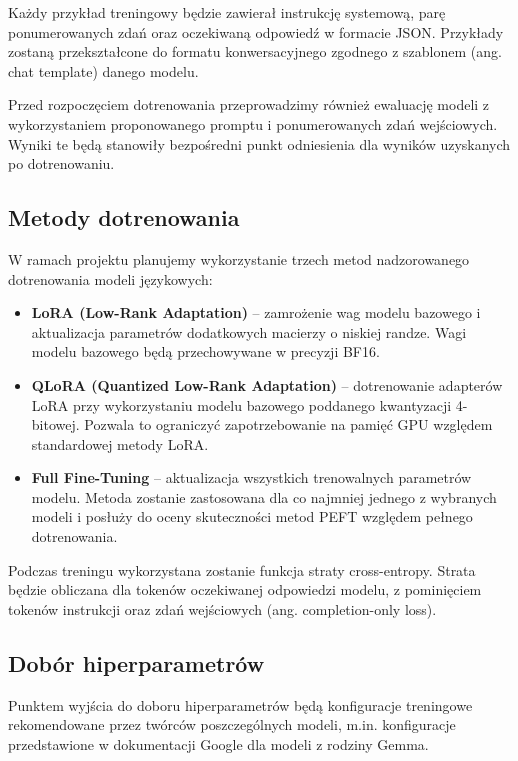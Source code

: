 \documentclass[a4paper,10pt]{article}
\begin{document}
Każdy przykład treningowy będzie zawierał instrukcję
systemową, parę ponumerowanych zdań oraz oczekiwaną
odpowiedź w formacie JSON. Przykłady zostaną przekształcone
do formatu konwersacyjnego zgodnego z szablonem
(ang. chat template) danego modelu.

Przed rozpoczęciem dotrenowania przeprowadzimy również
ewaluację modeli z wykorzystaniem proponowanego promptu
i ponumerowanych zdań wejściowych. Wyniki te będą
stanowiły bezpośredni punkt odniesienia dla wyników
uzyskanych po dotrenowaniu.


\subsection{Metody dotrenowania}

W ramach projektu planujemy wykorzystanie trzech metod
nadzorowanego dotrenowania modeli językowych:

\begin{itemize}
    \item \textbf{LoRA (Low-Rank Adaptation)} --
    zamrożenie wag modelu bazowego i aktualizacja
    parametrów dodatkowych macierzy o niskiej randze.
    Wagi modelu bazowego będą przechowywane
    w precyzji BF16.

    \item \textbf{QLoRA (Quantized Low-Rank Adaptation)} --
    dotrenowanie adapterów LoRA przy wykorzystaniu
    modelu bazowego poddanego kwantyzacji 4-bitowej.
    Pozwala to ograniczyć zapotrzebowanie na pamięć GPU
    względem standardowej metody LoRA.

    \item \textbf{Full Fine-Tuning} --
    aktualizacja wszystkich trenowalnych parametrów
    modelu. Metoda zostanie zastosowana dla co najmniej
    jednego z wybranych modeli i posłuży do oceny
    skuteczności metod PEFT względem pełnego
    dotrenowania.
\end{itemize}

Podczas treningu wykorzystana zostanie funkcja straty
cross-entropy. Strata będzie obliczana dla tokenów
oczekiwanej odpowiedzi modelu, z pominięciem tokenów
instrukcji oraz zdań wejściowych
(ang. completion-only loss).


\subsection{Dobór hiperparametrów}

Punktem wyjścia do doboru hiperparametrów będą
konfiguracje treningowe rekomendowane przez twórców
poszczególnych modeli, m.in. konfiguracje przedstawione
w dokumentacji Google dla modeli z rodziny Gemma.
\end{document}
